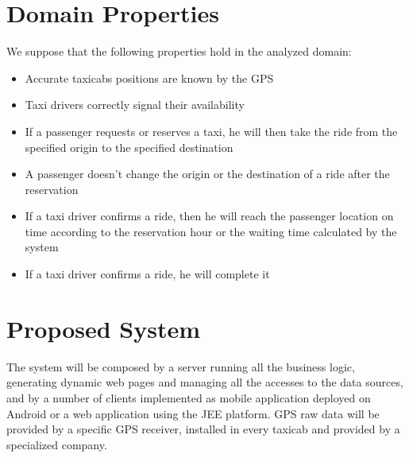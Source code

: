 \section{Domain Properties}
\noindent We suppose that the following properties hold in the analyzed domain:
\begin{itemize}
	\item Accurate taxicabs positions are known by the GPS
	\item Taxi drivers correctly signal their availability
	\item If a passenger requests or reserves a taxi, he will then take the ride from the specified origin to the specified destination
	\item A passenger doesn't change the origin or the destination of a ride after the reservation
	\item If a taxi driver confirms a ride, then he will reach the passenger location on time according to the reservation hour or the waiting time calculated by the system
	\item If a taxi driver confirms a ride, he will complete it
\end{itemize}

\section{Proposed System}
The system will be composed by a server running all the business logic, generating dynamic web pages and managing all the accesses to the data sources, and by a number of clients implemented as mobile application deployed on Android or a web application using the JEE platform. GPS raw data will be provided by a specific GPS receiver, installed in every taxicab and provided by a specialized company.

